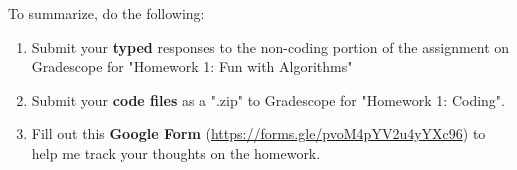 \documentclass [12pt]{article}
\begin{document}
To summarize, do the following:
\begin{enumerate}
    \item Submit your \textbf{typed} responses to the non-coding portion of the assignment on Gradescope for "Homework 1: Fun with Algorithms"
    \item Submit your \textbf{code files} as a ".zip" to Gradescope for "Homework 1: Coding".
    \item Fill out this \textbf{Google Form} (\href{https://forms.gle/pvoM4pYV2u4yYXc96}{https://forms.gle/pvoM4pYV2u4yYXc96}) to help me track your thoughts on the homework.
\end{enumerate}
\end{document}
